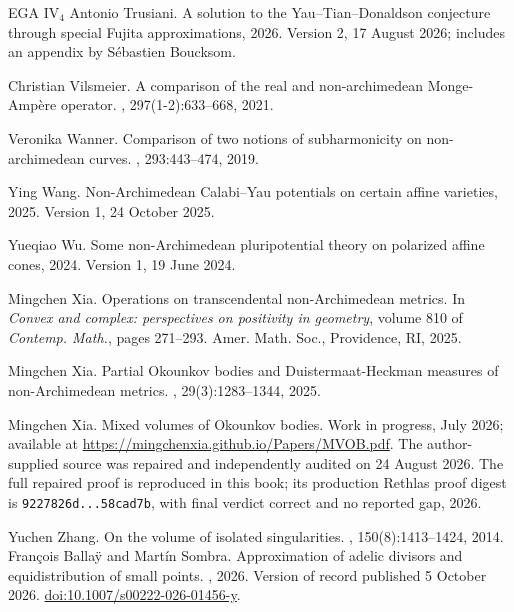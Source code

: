 \documentclass[11pt,a4paper]{article}
\theoremstyle{definition}
\theoremstyle{remark}
\begin{document}
\begin{thebibliography}{EGA IV$_4$}
Antonio Trusiani.
\newblock A solution to the {Y}au--{T}ian--{D}onaldson conjecture through
  special {F}ujita approximations, 2026.
\newblock Version 2, 17 August 2026; includes an appendix by S\'{e}bastien
  Boucksom.

Christian Vilsmeier.
\newblock A comparison of the real and non-archimedean {M}onge-{A}mp\`ere
  operator.
, 297(1-2):633--668, 2021.

Veronika Wanner.
\newblock Comparison of two notions of subharmonicity on non-archimedean
  curves.
, 293:443--474, 2019.

Ying Wang.
\newblock Non-{A}rchimedean {C}alabi--{Y}au potentials on certain affine
  varieties, 2025.
\newblock Version 1, 24 October 2025.

Yueqiao Wu.
\newblock Some non-{A}rchimedean pluripotential theory on polarized affine
  cones, 2024.
\newblock Version 1, 19 June 2024.

Mingchen Xia.
\newblock Operations on transcendental non-{A}rchimedean metrics.
\newblock In {\em Convex and complex: perspectives on positivity in geometry},
  volume 810 of {\em Contemp. Math.}, pages 271--293. Amer. Math. Soc.,
  Providence, RI, 2025.

Mingchen Xia.
\newblock Partial {O}kounkov bodies and {D}uistermaat-{H}eckman measures of
  non-{A}rchimedean metrics.
, 29(3):1283--1344, 2025.

Mingchen Xia.
\newblock Mixed volumes of {O}kounkov bodies.
\newblock Work in progress, July 2026; available at
  \url{https://mingchenxia.github.io/Papers/MVOB.pdf}. The author-supplied
  source was repaired and independently audited on 24 August 2026. The full
  repaired proof is reproduced in this book; its production Rethlas proof
  digest is \texttt{9227826d...58cad7b}, with final verdict correct and no
  reported gap, 2026.

Yuchen Zhang.
\newblock On the volume of isolated singularities.
, 150(8):1413--1424, 2014.
Fran{\c c}ois Balla{\"y} and Mart{\'i}n Sombra.
\newblock Approximation of adelic divisors and equidistribution of small points.
, 2026.
\newblock Version of record published 5 October 2026.
\newblock \href{https://doi.org/10.1007/s00222-026-01456-y}{doi:10.1007/s00222-026-01456-y}.

\end{thebibliography}
\end{document}
